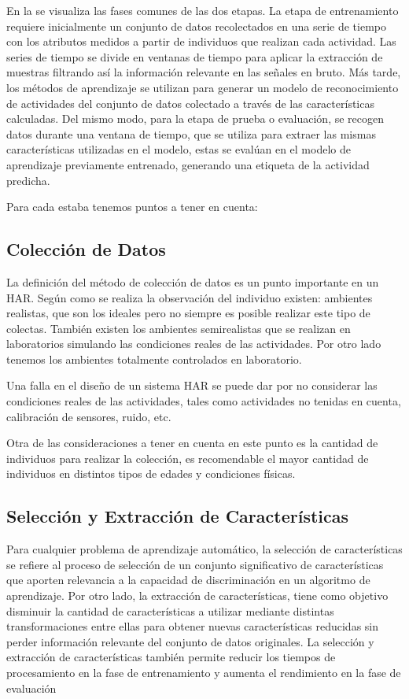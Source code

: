 En la  se visualiza las fases comunes de
las dos etapas. La etapa de entrenamiento requiere inicialmente un
conjunto de datos recolectados en una serie de tiempo con los atributos
medidos a partir de individuos que realizan cada actividad. Las series
de tiempo se divide en ventanas de tiempo para aplicar la extracción
de muestras filtrando así la información relevante en las señales
en bruto. Más tarde, los métodos de aprendizaje se utilizan para generar
un modelo de reconocimiento de actividades del conjunto de datos colectado
a través de las características calculadas. Del mismo modo, para la
etapa de prueba o evaluación, se recogen datos durante una ventana
de tiempo, que se utiliza para extraer las mismas características
utilizadas en el modelo, estas se evalúan en el modelo de aprendizaje
previamente entrenado, generando una etiqueta de la actividad predicha.

Para cada estaba tenemos puntos a tener en cuenta:

\subsection{Colección de Datos}

La definición del método de colección de datos es un punto importante
en un HAR. Según como se realiza la observación del individuo existen:
ambientes realistas, que son los ideales pero no siempre es posible
realizar este tipo de colectas. También existen los ambientes semirealistas
que se realizan en laboratorios simulando las condiciones reales de
las actividades. Por otro lado tenemos los ambientes totalmente controlados
en laboratorio.

Una falla en el diseño de un sistema HAR se puede dar por no considerar
las condiciones reales de las actividades, tales como actividades
no tenidas en cuenta, calibración de sensores, ruido, etc.

Otra de las consideraciones a tener en cuenta en este punto es la
cantidad de individuos para realizar la colección, es recomendable
el mayor cantidad de individuos en distintos tipos de edades y condiciones
físicas.

\subsection{Selección y Extracción de Características}

Para cualquier problema de aprendizaje automático, la selección de
características se refiere al proceso de selección de un conjunto
significativo de características que aporten relevancia a la capacidad
de discriminación en un algoritmo de aprendizaje. Por otro lado, la
extracción de características, tiene como objetivo disminuir la cantidad
de características a utilizar mediante distintas transformaciones
entre ellas para obtener nuevas características reducidas sin perder
información relevante del conjunto de datos originales. La selección
y extracción de características también permite reducir los tiempos
de procesamiento en la fase de entrenamiento y aumenta el rendimiento
en la fase de evaluación

